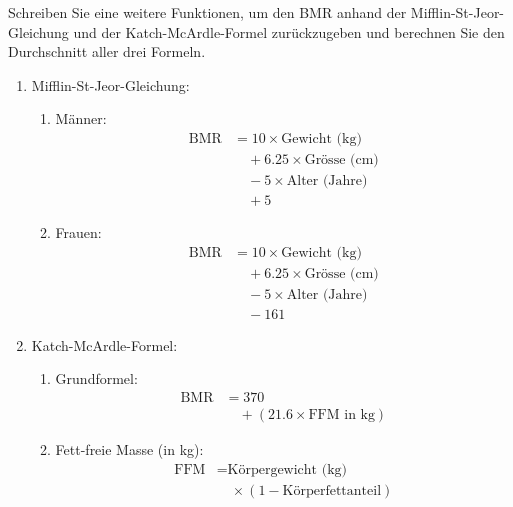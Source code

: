 \begin{myexercise}\label{ex:bmr}
	Schreiben Sie eine weitere Funktionen, um den \gls{BMR} anhand der Mifflin-St-Jeor-Gleichung und der Katch-McArdle-Formel zurückzugeben und berechnen Sie den Durchschnitt aller drei Formeln.
	\begin{enumerate}
		\item Mifflin-St-Jeor-Gleichung:
		      \begin{enumerate}
			      \item Männer:
			            \begin{align*}
				            \text{BMR} & = 10 \times \text{Gewicht (kg)}        \\
				                       & \quad + 6.25 \times \text{Grösse (cm)} \\
				                       & \quad - 5 \times \text{Alter (Jahre)}  \\
				                       & \quad + 5
			            \end{align*}
			      \item Frauen:
			            \begin{align*}
				            \text{BMR} & = 10 \times \text{Gewicht (kg)}        \\
				                       & \quad + 6.25 \times \text{Grösse (cm)} \\
				                       & \quad - 5 \times \text{Alter (Jahre)}  \\
				                       & \quad - 161
			            \end{align*}
		      \end{enumerate}
		\item Katch-McArdle-Formel:
		      \begin{enumerate}
			      \item Grundformel:
			            \begin{align*}
				            \text{BMR} & = 370                                  \\
				                       & \quad + (21.6 \times \text{FFM in kg})
			            \end{align*}

			      \item Fett-freie Masse (in kg):
			            \begin{align*}
				            \text{FFM} & = \text{Körpergewicht (kg)}                \\
				                       & \quad \times (1 - \text{Körperfettanteil})
			            \end{align*}

		      \end{enumerate}

	\end{enumerate}

	\begin{myanswer}
		
	\end{myanswer}
\end{myexercise}

